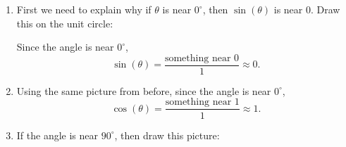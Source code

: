 \documentclass[noauthor,nooutcomes,12pt]{ximera}
\begin{document}
\begin{question}
  \begin{freeResponse}
    \begin{enumerate}
    \item First we need to explain why if $\theta$ is near $0^\circ$,
      then $\sin(\theta)$ is near $0$.  Draw this on the unit circle:
      \begin{center}
      \end{center}
      Since the angle is near $0^\circ$,
      \[
      \sin(\theta) = \frac{\text{something near $0$}}{1} \approx 0.
      \]
    \item Using the same picture from before, since the angle is near $0^\circ$,
      \[
      \cos(\theta) = \frac{\text{something near $1$}}{1} \approx 1.
      \]
    \item If the angle is near $90^\circ$, then draw this picture:
      \begin{center}
\end{center}
\end{enumerate}
\end{freeResponse}
\end{question}
\end{document}
